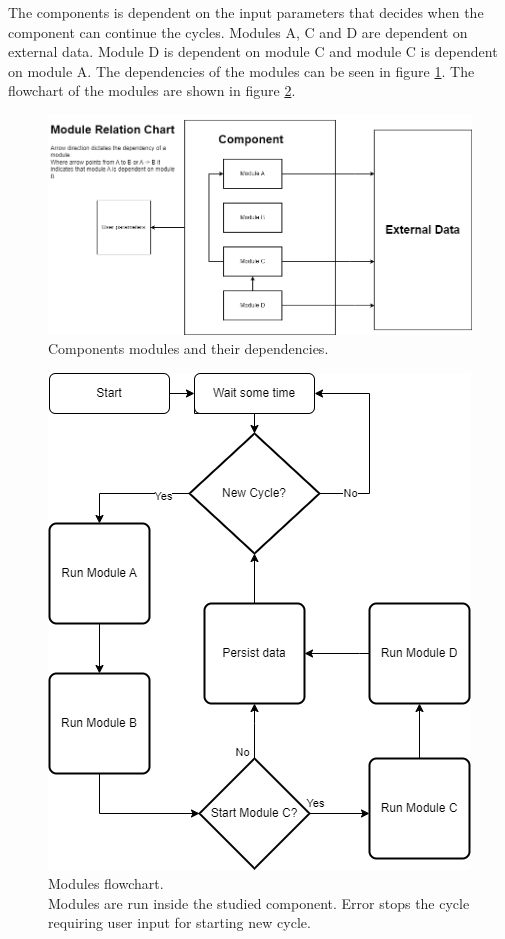 The components is dependent on the input parameters that decides when the component can continue the cycles.
Modules A, C and D are dependent on external data.
Module D is dependent on module C and module C is dependent on module A.
The dependencies of the modules can be seen in figure \ref{figure:module:relation}.
The flowchart of the modules are shown in figure \ref{figure:module:flow}.

\begin{figure}
    \includegraphics[width=\textwidth]{images/modules_relation_uml.png}
    \caption{Components modules and their dependencies.}
    \label{figure:module:relation}
\end{figure}


\begin{figure}
    \includegraphics[scale=0.8]{images/module_flow_chart.png}
    \caption{Modules flowchart. 
    \\ Modules are run inside the studied component. Error stops the cycle requiring user input for starting new cycle.}
    \label{figure:module:flow}
\end{figure}

